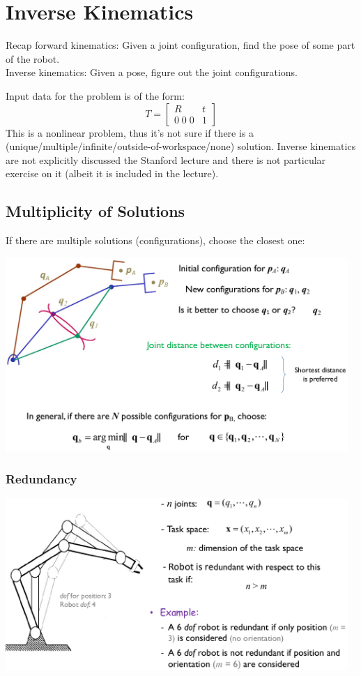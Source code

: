 \section{Inverse Kinematics}
Recap forward kinematics: Given a joint configuration, find the pose of some part of the robot.\\
Inverse kinematics: Given a pose, figure out the joint configurations.

Input data for the problem is of the form:
\[ T=\left[\begin{array}{cc}
R & t \\
0 \; 0 \; 0 & 1
\end{array}\right] \]
This is a nonlinear problem, thus it's not sure if there is a (unique/multiple/infinite/outside-of-workspace/none) solution. Inverse kinematics are not explicitly discussed the Stanford lecture and there is not particular exercise on it (albeit it is included in the lecture). 

\subsection{Multiplicity of Solutions}
If there are multiple solutions (configurations), choose the closest one:

{\centering 
\includegraphics[width=13cm]{sections/imgs/12.png}
\\}
\subsubsection{Redundancy}
{\centering 
\includegraphics[width=13cm]{sections/imgs/13.png}
\\}

